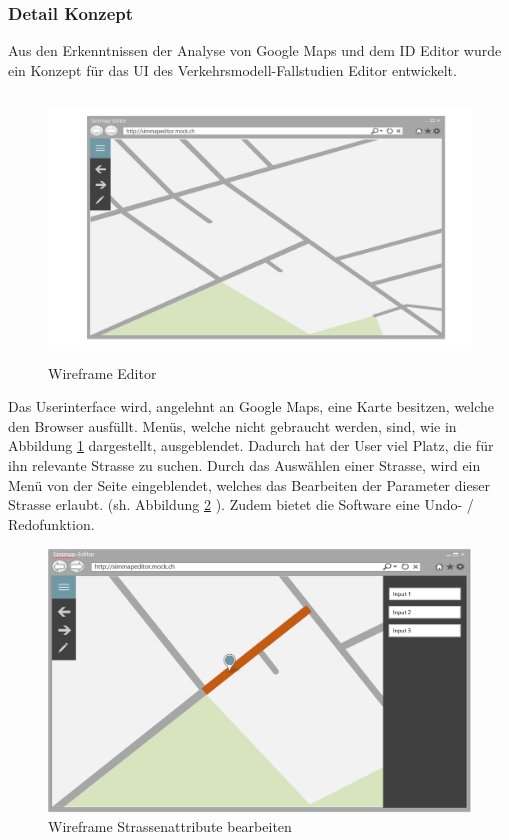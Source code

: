 \subsubsection{Detail Konzept}
Aus den Erkenntnissen der Analyse von Google Maps und dem ID Editor wurde ein Konzept für das UI des Verkehrsmodell-Fallstudien Editor entwickelt.
\begin{figure}[H]
\centering
\includegraphics[height=7cm]{images/KonzeptUI.png}
\caption{Wireframe Editor}
\label{fig:conceptui}
\end{figure}
\noindent
Das Userinterface wird, angelehnt an Google Maps, eine Karte besitzen, welche den Browser ausfüllt. Menüs, welche nicht gebraucht werden, sind, wie in Abbildung \ref{fig:conceptui}  dargestellt, ausgeblendet. Dadurch hat der User viel Platz, die für ihn relevante Strasse zu suchen. Durch das Auswählen einer Strasse, wird ein Menü von der Seite eingeblendet, welches das Bearbeiten der Parameter dieser Strasse erlaubt. (sh. Abbildung \ref{fig:concepteditStreet} ). Zudem bietet die Software eine Undo- / Redofunktion.
\begin{figure}[H]
\centering
\includegraphics[height=7cm]{images/KonzeptEditStreet.png}
\caption{Wireframe Strassenattribute bearbeiten}
\label{fig:concepteditStreet}
\end{figure}
